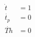 \documentclass[10pt]{article}
\begin{document}
\begin{align*}\dot{t} &= 1 \\
\dot{t_p} &=0 \\
\dot{Th}&=0\end{align*}
\end{document}

